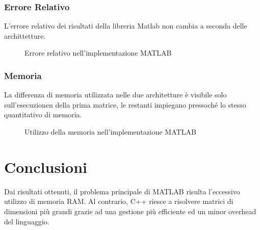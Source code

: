 \documentclass[11pt,italian]{article}
\begin{document}
\subsubsection*{Errore Relativo}
L'errore relativo dei risultati della libreria Matlab non cambia a seconda delle archittetture.
\begin{figure}[H]
    \caption{Errore relativo nell'implementazione MATLAB}
    \label{fig:matlab-error}
\end{figure}

\subsubsection*{Memoria}
La differenza di memoria utilizzata nelle due architetture è visibile solo sull'esecuzionen della prima matrice, le restanti impiegano pressoché lo stesso quantitativo di memoria.
\begin{figure}[H]
    \caption{Utilizzo della memoria nell'implementazione MATLAB}
    \label{fig:matlab-memory}
\end{figure}

\newpage
\section{Conclusioni}
Dai risultati ottenuti, il problema principale di MATLAB risulta l'eccessivo utilizzo di memoria RAM. Al contrario, C++ riesce a risolvere matrici di dimensioni più grandi grazie ad una gestione più efficiente ed un minor overhead del linguaggio.
\end{document}
